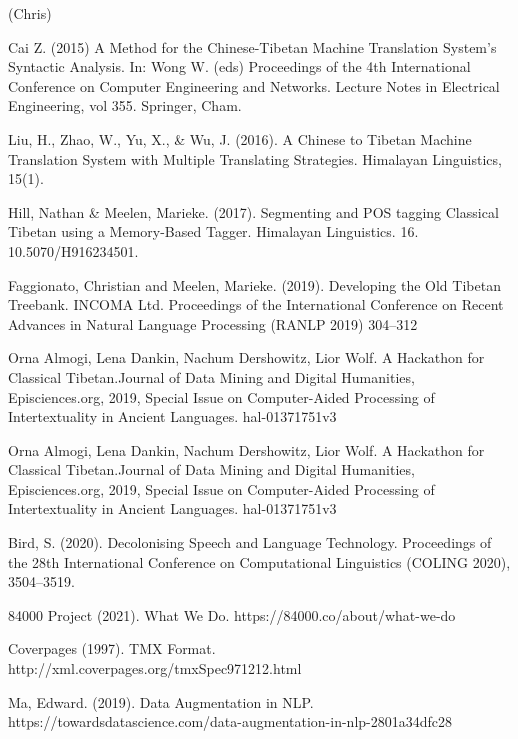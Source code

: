\documentclass[letterpaper, 12 pt, conference]{ieeeconf}  %
\begin{document}
(Chris)
\begin{thebibliography}{99}



 Cai Z. (2015) A Method for the Chinese-Tibetan Machine Translation System’s Syntactic Analysis. In: Wong W. (eds) Proceedings of the 4th International Conference on Computer Engineering and Networks. Lecture Notes in Electrical Engineering, vol 355. Springer, Cham. 

 Liu, H., Zhao, W., Yu, X., & Wu, J. (2016). A Chinese to Tibetan Machine Translation System with Multiple Translating Strategies. Himalayan Linguistics, 15(1).

 Hill, Nathan & Meelen, Marieke. (2017). Segmenting and POS tagging Classical Tibetan using a Memory-Based Tagger. Himalayan Linguistics. 16. 10.5070/H916234501. 

 Faggionato, Christian  and Meelen, Marieke. (2019). Developing the Old Tibetan Treebank. INCOMA Ltd. Proceedings of the International Conference on Recent Advances in Natural Language Processing (RANLP 2019) 304--312


 Orna Almogi, Lena Dankin, Nachum Dershowitz, Lior Wolf. A Hackathon for Classical Tibetan.Journal of Data Mining and Digital Humanities, Episciences.org, 2019, Special Issue on Computer-Aided Processing of Intertextuality in Ancient Languages. hal-01371751v3

 Orna Almogi, Lena Dankin, Nachum Dershowitz, Lior Wolf. A Hackathon for Classical Tibetan.Journal of Data Mining and Digital Humanities, Episciences.org, 2019, Special Issue on Computer-Aided Processing of Intertextuality in Ancient Languages. hal-01371751v3


 Bird, S. (2020). Decolonising Speech and Language Technology. Proceedings of the 28th International Conference on Computational Linguistics (COLING 2020), 3504–3519.


 84000 Project (2021). What We Do. https://84000.co/about/what-we-do


 Coverpages (1997). TMX Format. http://xml.coverpages.org/tmxSpec971212.html

 Ma, Edward. (2019). Data Augmentation in NLP. https://towardsdatascience.com/data-augmentation-in-nlp-2801a34dfc28




\end{thebibliography}
\end{document}
